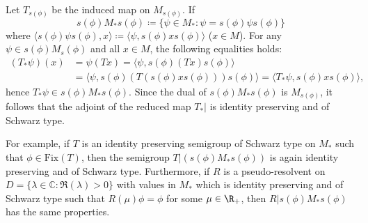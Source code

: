 \newpage
Let $ T_{s(\phi)} $ be the induced map on $ M_{s(\phi)} $. 
If
\[
s(\phi)M_{*}s(\phi) \coloneqq \{\psi \in M_{*} \colon \psi = s(\phi)\psi s(\phi)\}
\]
where $ \langle s(\phi)\psi s(\phi),x \rangle \coloneqq \langle \psi,s(\phi)xs(\phi) \rangle $ ($ x \in M $).
For any $\psi \in s(\phi)M_s(\phi)$ and all $x \in M$, the following equalities holds:
\begin{align*}
(T_{*}\psi)(x) &= \psi(Tx) = \langle \psi,s(\phi)(Tx)s(\phi) \rangle \\
	&= \langle \psi,s(\phi)(T(s(\phi)xs(\phi)))s(\phi) \rangle = \langle T_{*}\psi,s(\phi)xs(\phi) \rangle,
\end{align*}
hence $ T_{*}\psi \in s(\phi)M_{*}s(\phi) $.
Since the dual of $ s(\phi)M_{*}s(\phi) $ is $ M_{s(\phi)} $, it follows that the adjoint of the reduced map $ T_{*}| $ is identity preserving and of Schwarz type.

For example, if $ T $ is an identity preserving semigroup of Schwarz type on $ M_{*} $ such that $ \phi \in \text{Fix}(T) $, then the semigroup $ T|(s(\phi)M_{*}s(\phi)) $ is again identity preserving and of Schwarz type.
Furthermore, if $ R $ is a pseudo-resolvent on $ D = \{\lambda \in \mathbb{C} \colon \Re(\lambda) > 0\} $ with values in $ M_{*} $ which is identity preserving and of Schwarz type such that $ R(\mu)\phi = \phi $ for some $ \mu \in \R_{+} $, then $ R|s(\phi)M_{*}s(\phi) $ has the same properties.

